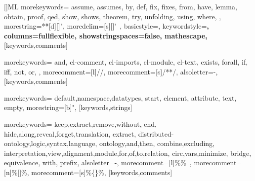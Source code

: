 \RequirePackage{listings}
% 
% 
% 
% 

[]{ML}%
{morekeywords={%
assume,%
assumes,%
by,%
def,%
fix,%
fixes,%
from,%
have,%
lemma,%
obtain,%
proof,%
qed,%
show,%
shows,%
theorem,%
try,%
unfolding,%
using,%
where,%
},
morestring=**[d][\color{IsabelleStringBackground}]{"},
moredelim=[s][\color{IsabelleTypeColor}]{'}{\ },
basicstyle={},%
keywordstyle=\upshape\bfseries,%
columns=fullflexible,%
showstringspaces=false,%
mathescape,%
}[keywords,comments]

%
{morekeywords={%
and,%
cl-comment,%
cl-imports,%
cl-module,%
cl-text,%
exists,%
forall,%
if,%
iff,%
not,%
or,%
},
morecomment=[l]{//},%
morecomment=[s]{/*}{*/},%
alsoletter=-,%
}[keywords,comments]

%
{morekeywords={%
default,namespace,datatypes,%
start,%
element,%
attribute,%
text,%
empty},
morestring=[b]",%
}[keywords,strings]

%
{morekeywords={%
keep,extract,remove,without,%
end,%
hide,along,reveal,forget,translation,%
extract,%
distributed-ontology,logic,syntax,language,%
ontology,and,then,%
combine,excluding,%
interpretation,view,alignment,module,for,of,to,relation,%
circ,vars,minimize,%
bridge,%
equivalence,%
with,%
prefix},
alsoletter=-,%
morecomment=[l]{\%\%\ },%
morecomment=[n]{\%[}{]\%},%
morecomment=[s]{\%\{}{\}\%},%
}[keywords,comments]

